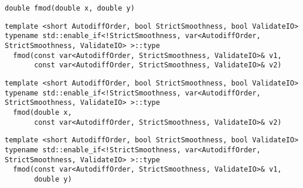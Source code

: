 \begin{tcolorbox}[colback=white,colframe=gray90, coltitle=black,boxrule=3pt,
fonttitle=\bfseries,title= Fmod]

\begin{verbatim}
double fmod(double x, double y)

\end{verbatim}

\begin{verbatim}
template <short AutodiffOrder, bool StrictSmoothness, bool ValidateIO>
typename std::enable_if<!StrictSmoothness, var<AutodiffOrder, StrictSmoothness, ValidateIO> >::type
  fmod(const var<AutodiffOrder, StrictSmoothness, ValidateIO>& v1,
       const var<AutodiffOrder, StrictSmoothness, ValidateIO>& v2)

\end{verbatim}

\begin{verbatim}
template <short AutodiffOrder, bool StrictSmoothness, bool ValidateIO>
typename std::enable_if<!StrictSmoothness, var<AutodiffOrder, StrictSmoothness, ValidateIO> >::type
  fmod(double x,
       const var<AutodiffOrder, StrictSmoothness, ValidateIO>& v2)

\end{verbatim}

\begin{verbatim}
template <short AutodiffOrder, bool StrictSmoothness, bool ValidateIO>
typename std::enable_if<!StrictSmoothness, var<AutodiffOrder, StrictSmoothness, ValidateIO> >::type
  fmod(const var<AutodiffOrder, StrictSmoothness, ValidateIO>& v1,
       double y)

\end{verbatim}

\end{tcolorbox}

